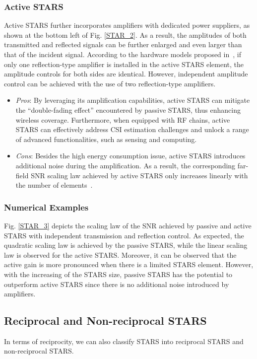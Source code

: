 \documentclass[journal]{IEEEtran}
\theoremstyle{definition}
\begin{document}
\subsubsection{Active STARS} Active STARS further incorporates amplifiers with dedicated power suppliers, as shown at the bottom left of Fig. \ref{STAR_2}. As a result, the amplitudes of both transmitted and reflected signals can be further enlarged and even larger than that of the incident signal. According to the hardware models proposed in~\cite{10163896}, if only one reflection-type amplifier is installed in the active STARS element, the amplitude controls for both sides are identical. However, independent amplitude control can be achieved with the use of two reflection-type amplifiers.
\begin{itemize}	
	\item \emph{Pros}: By leveraging its amplification capabilities, active STARS can mitigate the ``double-fading effect'' encountered by passive STARS, thus enhancing wireless coverage. Furthermore, when equipped with RF chains, active STARS can effectively address CSI estimation challenges and unlock a range of advanced functionalities, such as sensing and computing.
    \item \emph{Cons}: Besides the high energy consumption issue, active STARS introduces additional noise during the amplification. As a result, the corresponding far-field SNR scaling law achieved by active STARS only increases linearly with the number of elements~\cite{10163896}.
\end{itemize}

\subsubsection{Numerical Examples} Fig. \ref{STAR_3} depicts the scaling law of the SNR achieved by passive and active STARS with independent transmission and reflection control. As expected, the quadratic scaling law is achieved by the passive STARS, while the linear scaling law is observed for the active STARS. Moreover, it can be observed that the active gain is more pronounced when there is a limited STARS element. However, with the increasing of the STARS size, passive STARS has the potential to outperform active STARS since there is no additional noise introduced by amplifiers.



\subsection{Reciprocal and Non-reciprocal STARS}
In terms of reciprocity, we can also classify STARS into reciprocal STARS and non-reciprocal STARS.
\end{document}
